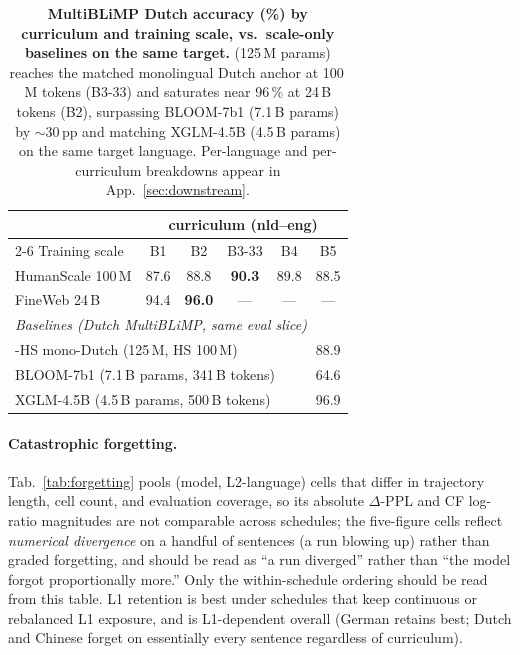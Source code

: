  
\begin{table}[!ht]
  \centering
  \small
  \setlength{\tabcolsep}{4pt}
  \caption{\textbf{MultiBLiMP Dutch accuracy (\%) by \beetle{} curriculum and training scale, vs.~scale-only baselines on the same target.} \beetle{} (125\,M params) reaches the matched monolingual Dutch anchor at 100\,M tokens (B3-33) and saturates near 96\,\% at 24\,B tokens (B2), surpassing BLOOM-7b1 (7.1\,B params) by $\sim$30\,pp and matching XGLM-4.5B (4.5\,B params) on the same target language. Per-language and per-curriculum breakdowns appear in App.~\ref{sec:downstream}.}
  \label{tab:multiblimp_efficiency}
  \begin{tabular}{l c c c c c}
    \toprule
    & \multicolumn{5}{c}{\beetle{} curriculum (nld--eng)} \\
    \cmidrule(lr){2-6}
    Training scale & B1 & B2 & B3-33 & B4 & B5 \\
    \midrule
    HumanScale 100\,M  & 87.6 & 88.8 & \textbf{90.3} & 89.8 & 88.5 \\
    FineWeb 24\,B      & 94.4 & \textbf{96.0} & ---  & ---  & ---  \\
    \midrule
    \multicolumn{6}{l}{\emph{Baselines (Dutch MultiBLiMP, same eval slice)}} \\
    \multicolumn{5}{l}{\beetle{}-HS mono-Dutch (125\,M, HS 100\,M)} & 88.9 \\
    \multicolumn{5}{l}{BLOOM-7b1 (7.1\,B params, 341\,B tokens)} & 64.6 \\
    \multicolumn{5}{l}{XGLM-4.5B (4.5\,B params, 500\,B tokens)} & 96.9 \\
    \bottomrule
  \end{tabular}
\end{table}
 
 
\paragraph{Catastrophic forgetting.} Tab.~\ref{tab:forgetting} pools (model, L2-language) cells that differ in trajectory length, cell count, and evaluation coverage, so its absolute $\Delta$-PPL and CF log-ratio magnitudes are not comparable across schedules; the five-figure cells reflect \emph{numerical divergence} on a handful of sentences (a run blowing up) rather than graded forgetting, and should be read as ``a run diverged'' rather than ``the model forgot proportionally more.'' Only the within-schedule ordering should be read from this table. L1 retention is best under schedules that keep continuous or rebalanced L1 exposure, and is L1-dependent overall (German retains best; Dutch and Chinese forget on essentially every sentence regardless of curriculum).
 
